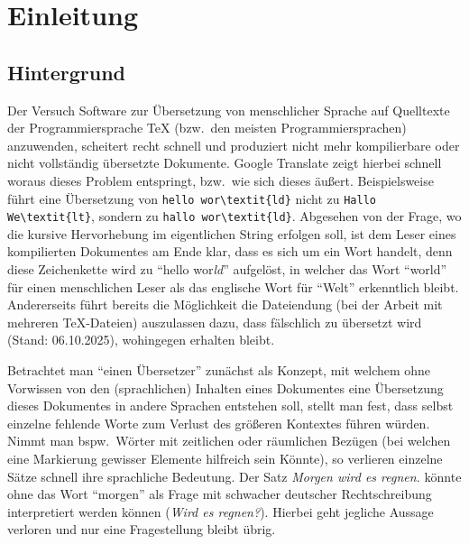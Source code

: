 \section{Einleitung}
\subsection{Hintergrund}
Der Versuch Software zur Übersetzung von menschlicher Sprache auf Quelltexte der Programmiersprache \TeX{} (bzw.\ den meisten Programmiersprachen) anzuwenden, scheitert recht schnell und produziert nicht mehr kompilierbare oder nicht vollständig übersetzte Dokumente. Google Translate zeigt hierbei schnell woraus dieses Problem entspringt, bzw.\ wie sich dieses äußert. Beispielsweise führt eine Übersetzung von \verb|hello wor\textit{ld}| nicht zu \verb|Hallo We\textit{lt}|, sondern zu \verb|hallo wor\textit{ld}|. Abgesehen von der Frage, wo die kursive Hervorhebung im eigentlichen String erfolgen soll, ist dem Leser eines kompilierten Dokumentes am Ende klar, dass es sich um ein Wort handelt, denn diese Zeichenkette wird zu \enquote{hello wor\textit{ld}} aufgelöst, in welcher das Wort \enquote{world} für einen menschlichen Leser als das englische Wort für \enquote{Welt} erkenntlich bleibt. Andererseits führt bereits die Möglichkeit die Dateiendung (bei der Arbeit mit mehreren \TeX{}-Dateien) auszulassen dazu, dass \verb|| fälschlich zu \verb|| übersetzt wird (Stand: 06.10.2025), wohingegen \verb|| erhalten bleibt.\\%
\noindent 

Betrachtet man \enquote{einen Übersetzer} zunächst als Konzept, mit welchem ohne Vorwissen von den (sprachlichen) Inhalten eines Dokumentes eine Übersetzung dieses Dokumentes in andere Sprachen entstehen soll, stellt man fest, dass selbst einzelne fehlende Worte zum Verlust des größeren Kontextes führen würden. Nimmt man bspw.\ Wörter mit zeitlichen oder räumlichen Bezügen (bei welchen eine Markierung gewisser Elemente hilfreich sein Könnte), so verlieren einzelne Sätze schnell ihre sprachliche Bedeutung. Der Satz \textit{Morgen wird es regnen.} könnte ohne das Wort \enquote{morgen} als Frage mit schwacher deutscher Rechtschreibung interpretiert werden können (\textit{Wird es regnen?}). Hierbei geht jegliche Aussage verloren und nur eine Fragestellung bleibt übrig. 

